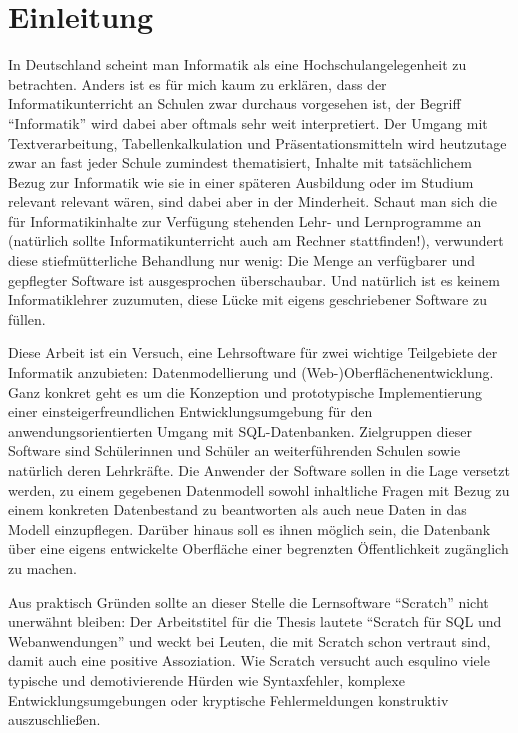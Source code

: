 \section{Einleitung}

In Deutschland scheint man Informatik als eine Hochschulangelegenheit zu betrachten. Anders ist es für mich kaum zu erklären, dass der Informatikunterricht an Schulen zwar durchaus vorgesehen ist, der Begriff ``Informatik'' wird dabei aber oftmals sehr weit interpretiert. Der Umgang mit Textverarbeitung, Tabellenkalkulation und Präsentationsmitteln wird heutzutage zwar an fast jeder Schule zumindest thematisiert, Inhalte mit tatsächlichem Bezug zur Informatik wie sie in einer späteren Ausbildung oder im Studium relevant relevant wären, sind dabei aber in der Minderheit. Schaut man sich die für Informatikinhalte zur Verfügung stehenden Lehr- und Lernprogramme an (natürlich sollte Informatikunterricht auch am Rechner stattfinden!), verwundert diese stiefmütterliche Behandlung nur wenig: Die Menge an verfügbarer und gepflegter Software ist ausgesprochen überschaubar. Und natürlich ist es keinem Informatiklehrer zuzumuten, diese Lücke mit eigens geschriebener Software zu füllen.

Diese Arbeit ist ein Versuch, eine Lehrsoftware für zwei wichtige Teilgebiete der Informatik anzubieten: Datenmodellierung und (Web-)Oberflächenentwicklung. Ganz konkret geht es um die Konzeption und prototypische Implementierung einer einsteigerfreundlichen Entwicklungsumgebung für den anwendungsorientierten Umgang mit SQL-Datenbanken. Zielgruppen dieser Software sind Schülerinnen und Schüler an weiterführenden Schulen sowie natürlich deren Lehrkräfte. Die Anwender der Software sollen in die Lage versetzt werden, zu einem gegebenen Datenmodell sowohl inhaltliche Fragen mit Bezug zu einem konkreten Datenbestand zu beantworten als auch neue Daten in das Modell einzupflegen. Darüber hinaus soll es ihnen möglich sein, die Datenbank über eine eigens entwickelte Oberfläche einer begrenzten Öffentlichkeit zugänglich zu machen.

Aus praktisch Gründen sollte an dieser Stelle die Lernsoftware "`Scratch"' nicht unerwähnt bleiben: Der Arbeitstitel für die Thesis lautete "`Scratch für SQL und Webanwendungen"' und weckt bei Leuten, die mit Scratch schon vertraut sind, damit auch eine positive Assoziation. Wie Scratch versucht auch esqulino viele typische und demotivierende Hürden wie Syntaxfehler, komplexe Entwicklungsumgebungen oder kryptische Fehlermeldungen konstruktiv auszuschließen.

